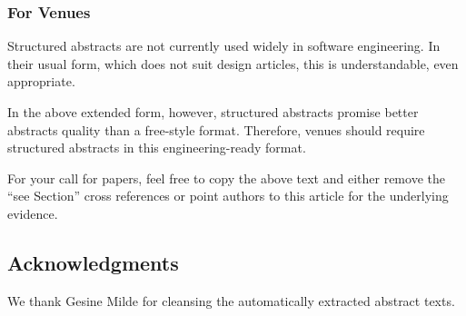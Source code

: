 \documentclass[10pt,journal,compsoc]{IEEEtran}
\newcommand{\ifarxiv}[1]{#1}  %
\begin{document}
\subsubsection{For Venues}

Structured abstracts are not currently used widely in software engineering.
In their usual form, which does not suit design articles, 
this is understandable, even appropriate.

In the above extended form, however, structured abstracts promise
better abstracts quality than a free-style format.
Therefore, venues should require structured abstracts in this
engineering-ready format.

For your call for papers, feel free to copy the above text and
either remove the ``see Section'' cross references or
point authors to this article for the underlying evidence.




\subsection*{Acknowledgments}
\noindent We thank Gesine Milde for cleansing the automatically extracted abstract texts.






\ifarxiv{}
\end{document}
